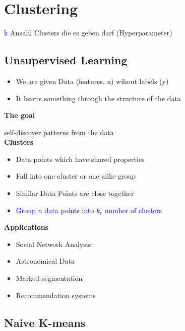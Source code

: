 \section{Clustering}
\textcolor{blue}{k} Anzahl Clusters die es geben darf (Hyperparameter)

\subsection{Unsupervised Learning}
\begin{itemize}
    \item We are given Data (features, x) wihout labels (y)
    \item It learns something through the structure of the data
\end{itemize}
\vspace{10pt}
\textbf{The goal}

self-discover patterns from the data \\

\textbf{Clusters}
\begin{itemize}
    \item Data points which have shared properties
    \item Fall into one cluster or one alike group
    \item Similar Data Points are close together
    \item \textcolor{blue}{Group $n$ data points into $k_c$ number of clusters}
\end{itemize}
\vspace{10pt}
\textbf{Applications}
\begin{itemize}
    \item Social Network Analysis
    \item Astronomical Data
    \item Marked segmentation
    \item Recommendation systems
\end{itemize}
\subsection{Naive K-means}

